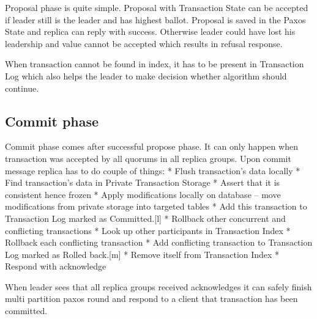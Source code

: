 Proposal phase is quite simple. Proposal with Transaction State can be accepted if leader still is the leader and has highest ballot. Proposal is saved in the Paxos State and replica can reply with success. Otherwise leader could have lost his leadership and value cannot be accepted which results in refusal response.


When transaction cannot be found in index, it has to be present in Transaction Log which also helps the leader to make decision whether algorithm should continue.


\subsection{Commit phase}
Commit phase comes after successful propose phase. It can only happen when transaction was accepted by all quorums in all replica groups. Upon commit message replica has to do couple of things:
* Flush transaction’s data locally
   * Find transaction’s data in Private Transaction Storage 
   * Assert that it is consistent hence frozen
   * Apply modifications locally on database -- move modifications from private storage into targeted tables
* Add this transaction to Transaction Log marked as Committed.[l]
* Rollback other concurrent and conflicting transactions
   * Look up other participants in Transaction Index
   * Rollback each conflicting transaction
   * Add conflicting transaction to Transaction Log marked as Rolled back.[m]
* Remove itself from Transaction Index
* Respond with acknowledge


When leader sees that all replica groups received acknowledges it can safely finish multi partition paxos round and respond to a client that transaction has been committed.


